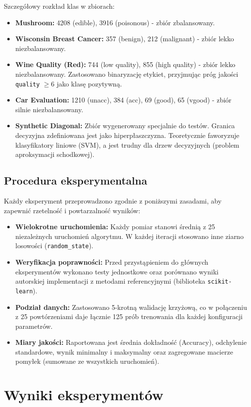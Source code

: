 \documentclass[a4paper,11pt]{article}
\begin{document}
Szczegółowy rozkład klas w zbiorach:
\begin{itemize}
    \item \textbf{Mushroom:} 4208 (edible), 3916 (poisonous) - zbiór zbalansowany.
    \item \textbf{Wisconsin Breast Cancer:} 357 (benign), 212 (malignant) - zbiór lekko niezbalansowany.
    \item \textbf{Wine Quality (Red):} 744 (low quality), 855 (high quality) - zbiór lekko niezbalansowany. Zastosowano binaryzację etykiet, przyjmując próg jakości \texttt{quality} $\geq 6$ jako klasę pozytywną.
    \item \textbf{Car Evaluation:} 1210 (unacc), 384 (acc), 69 (good), 65 (vgood) - zbiór silnie niezbalansowany.
    \item \textbf{Synthetic Diagonal:} Zbiór wygenerowany specjalnie do testów. Granica decyzyjna zdefiniowana jest jako hiperpłaszczyzna. Teoretycznie faworyzuje klasyfikatory liniowe (SVM), a jest trudny dla drzew decyzyjnych (problem aproksymacji schodkowej).
\end{itemize}

\subsection{Procedura eksperymentalna}
Każdy eksperyment przeprowadzono zgodnie z poniższymi zasadami, aby zapewnić rzetelność i powtarzalność wyników:
\begin{itemize}
    \item \textbf{Wielokrotne uruchomienia:} Każdy pomiar stanowi średnią z 25 niezależnych uruchomień algorytmu. W każdej iteracji stosowano inne ziarno losowości (\texttt{random\_state}).
    \item \textbf{Weryfikacja poprawności:} Przed przystąpieniem do głównych eksperymentów wykonano testy jednostkowe oraz porównano wyniki autorskiej implementacji z metodami referencyjnymi (biblioteka \texttt{scikit-learn}).
    \item \textbf{Podział danych:} Zastosowano 5-krotną walidację krzyżową, co w połączeniu z 25 powtórzeniami daje łącznie 125 prób trenowania dla każdej konfiguracji parametrów.
    \item \textbf{Miary jakości:} Raportowana jest średnia dokładność (Accuracy), odchylenie standardowe, wynik minimalny i maksymalny oraz zagregowane macierze pomyłek (sumowane ze wszystkich uruchomień).
\end{itemize}

\section{Wyniki eksperymentów}
\end{document}
